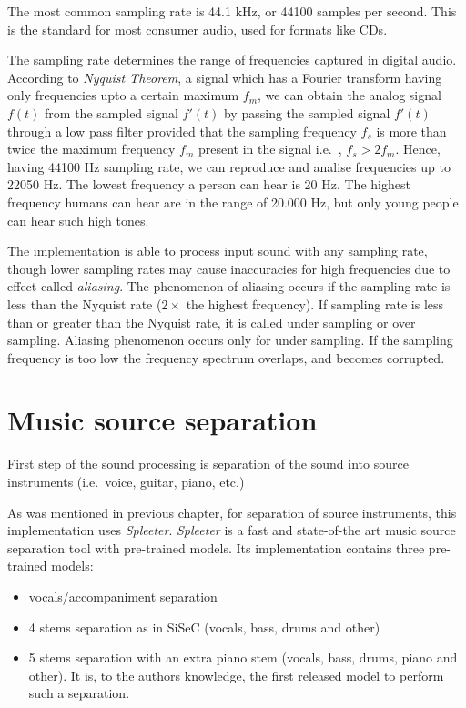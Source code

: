 The most common sampling rate is 44.1 kHz, or 44100 samples per second. This is the standard for most consumer audio,
used for formats like CDs\cite{digital-audio-basics}.

The sampling rate determines the range of frequencies captured in digital audio. According to \textit{Nyquist Theorem},
a signal which has a Fourier transform having only frequencies upto a certain maximum $f_m$, we can obtain the analog
signal $f(t)$ from the sampled signal $f'(t)$ by passing the sampled signal $f'(t)$ through a low pass filter provided
that the sampling frequency $f_s$ is more than twice the maximum frequency $f_m$ present in the signal i.e.\ ,
$f_s > 2f_m$\cite{signals-and-systems}. Hence, having 44100 Hz sampling rate, we can reproduce and analise frequencies
up to 22050 Hz. The lowest frequency a person can hear is 20 Hz. The highest frequency humans can hear are in the range
of 20.000 Hz, but only young people can hear such high tones\cite{roots-of-modern-technology}.

The implementation is able to process input sound with any sampling rate, though lower sampling rates may cause
inaccuracies for high frequencies due to effect called \textit{aliasing}. The phenomenon of aliasing occurs if
the sampling rate is less than the Nyquist rate ($2\times$ the highest frequency). If sampling rate is less than or greater
than the Nyquist rate, it is called under sampling or over sampling. Aliasing phenomenon occurs only for under sampling.
If the sampling frequency is too low the frequency spectrum overlaps, and becomes corrupted\cite{signals-and-systems}.

\pagebreak

\section{Music source separation}\label{sec:music-source-separation}

First step of the sound processing is separation of the sound into source instruments (i.e.\ voice, guitar, piano,
etc.)

As was mentioned in previous chapter, for separation of source instruments, this implementation uses \textit{Spleeter}.
\textit{Spleeter} is a fast and state-of-the art music source separation tool with pre-trained
models\cite{spleeter2019}. Its implementation contains three pre-trained models:

\begin{itemize}
	\item vocals/accompaniment separation
	\item 4 stems separation as in \ac{SiSeC}\cite{stter20182018} (vocals, bass, drums and other)
	\item 5 stems separation with an extra piano stem (vocals, bass, drums, piano and other). It is, to the authors
	knowledge, the first released model to perform such a separation.
\end{itemize}

